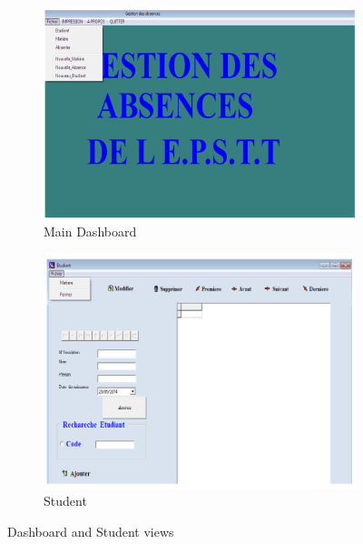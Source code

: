 \documentclass[12pt,a4paper]{report}
\begin{document}
\begin{figure}[htbp]
    \centering
    \begin{subfigure}[b]{0.45\textwidth}
        \centering
        \includegraphics[width=\textwidth]{images/morsli/mekki1.png}
        \caption{Main Dashboard}
        \label{fig:dashboard}
    \end{subfigure}
    \hfill
    \begin{subfigure}[b]{0.45\textwidth}
        \centering
        \includegraphics[width=\textwidth]{images/morsli/mekki2.png}
        \caption{Student}
        \label{fig:student}
    \end{subfigure}
    \caption{Dashboard and Student views}
    \label{fig:attendance-system}
\end{figure}
\end{document}
